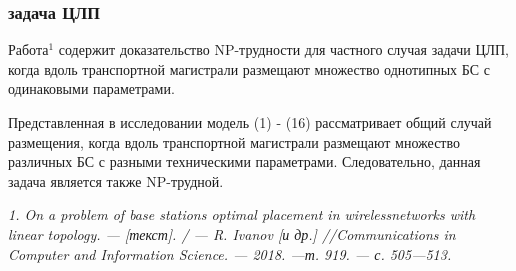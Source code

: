 \begin{frame}
    \frametitle{задача ЦЛП}
    \justifying
    
    Работа$^1$ содержит доказательство NP-трудности для частного случая задачи ЦЛП, когда вдоль транспортной магистрали размещают множество однотипных БС с одинаковыми параметрами. 
    \bigskip
    
    Представленная в исследовании модель (1) - (16) рассматривает общий случай размещения, когда вдоль транспортной магистрали размещают множество различных БС с разными техническими параметрами. Следовательно, данная задача является также NP-трудной.
    \bigskip

    
    \bigskip

    \bigskip
    \bigskip
    \begin{minipage}[b]{0.99\linewidth}
        \fontsize{6pt}{7.2}\selectfont
    \textit{1. On a problem of base stations optimal placement in wirelessnetworks with linear topology. — [текст]. / — R. Ivanov [и др.] //Communications in Computer and Information Science. — 2018. —т. 919. — с. 505—513.}
    \end{minipage}

\end{frame}

